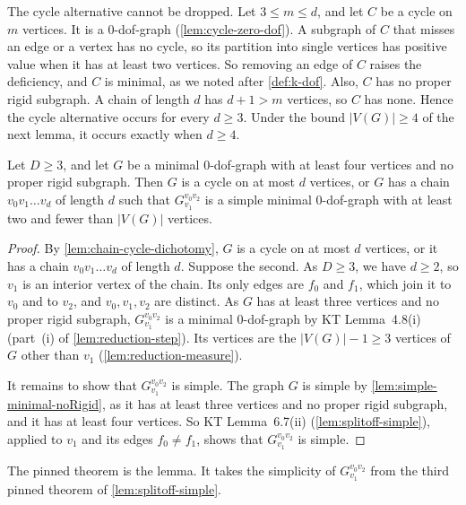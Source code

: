 The cycle alternative cannot be dropped. Let $3 \le m \le d$, and let
$C$ be a cycle on $m$ vertices. It is a $0$-dof-graph
(\cref{lem:cycle-zero-dof}). A subgraph of $C$ that misses an edge or a
vertex has no cycle, so its partition into single vertices has positive
value when it has at least two vertices. So removing an edge of $C$
raises the deficiency, and $C$ is minimal, as we noted after
\cref{def:k-dof}. Also, $C$ has no proper rigid subgraph. A chain of
length $d$ has $d + 1 > m$ vertices, so $C$ has none. Hence the cycle
alternative occurs for every $d \ge 3$. Under the bound $|V(G)| \ge 4$
of the next lemma, it occurs exactly when $d \ge 4$.

\begin{lemma}
  \label{lem:chain-data-extract}
  \leanok
  Let $D \ge 3$, and let $G$ be a minimal $0$-dof-graph with at least
  four vertices and no proper rigid subgraph. Then $G$ is a cycle on at
  most $d$ vertices, or $G$ has a chain $v_0 v_1 \dots v_d$ of
  length $d$ such that $G_{v_1}^{v_0 v_2}$ is a simple minimal
  $0$-dof-graph with at least two and fewer than $|V(G)|$ vertices.
\end{lemma}
\begin{proof}
  \leanok
  By \cref{lem:chain-cycle-dichotomy}, $G$ is a cycle on at most $d$
  vertices, or it has a chain $v_0 v_1 \dots v_d$ of length $d$. Suppose
  the second. As $D \ge 3$, we have $d \ge 2$, so $v_1$ is an interior
  vertex of the chain. Its only edges are $f_0$ and $f_1$, which join it
  to $v_0$ and to $v_2$, and $v_0, v_1, v_2$ are distinct. As $G$ has at
  least three vertices and no proper rigid subgraph, $G_{v_1}^{v_0 v_2}$
  is a minimal $0$-dof-graph by KT Lemma~4.8(i) (part~(i) of
  \cref{lem:reduction-step}). Its vertices are the $|V(G)| - 1 \ge 3$
  vertices of $G$ other than $v_1$ (\cref{lem:reduction-measure}).

  It remains to show that $G_{v_1}^{v_0 v_2}$ is simple. The graph $G$
  is simple by \cref{lem:simple-minimal-noRigid}, as it has at least
  three vertices and no proper rigid subgraph, and it has at least four
  vertices. So KT Lemma~6.7(ii)
  (\cref{lem:splitoff-simple}), applied to $v_1$ and its edges
  $f_0 \neq f_1$, shows that $G_{v_1}^{v_0 v_2}$ is simple.
\end{proof}
\begin{fmlnote}
  The pinned theorem is the lemma. It takes the simplicity of
  $G_{v_1}^{v_0 v_2}$ from the third pinned theorem of
  \cref{lem:splitoff-simple}.
\end{fmlnote}
